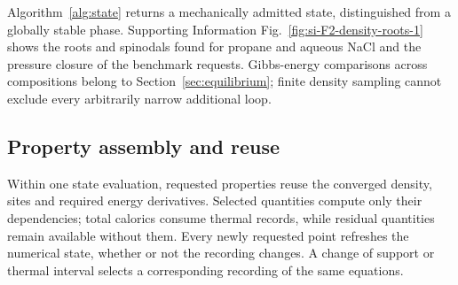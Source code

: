 Algorithm~\ref{alg:state} returns a mechanically admitted state, distinguished from a globally stable phase.
Supporting Information Fig.~\ref{fig:si-F2-density-roots-1} shows the roots and spinodals found for propane and aqueous NaCl and the pressure closure of the benchmark requests.
Gibbs-energy comparisons across compositions belong to Section~\ref{sec:equilibrium}; finite density sampling cannot exclude every arbitrarily narrow additional loop.


\subsection{Property assembly and reuse}
Within one state evaluation, requested properties reuse the converged density, sites and required energy derivatives.
Selected quantities compute only their dependencies; total calorics consume thermal records, while residual quantities remain available without them.
Every newly requested point refreshes the numerical state, whether or not the recording changes.
A change of support or thermal interval selects a corresponding recording of the same equations.
